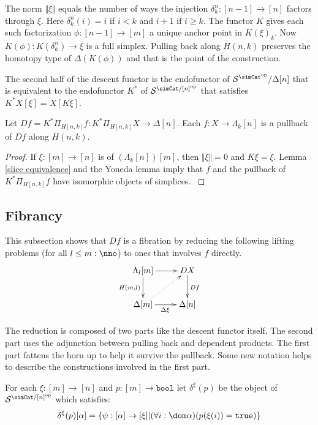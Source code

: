 \documentclass{tac}
\newcommand\cat\mathcal
\newcommand\set[1]{\left\{#1\right\}}
\newcommand\ri{^*}
\newcommand\dual{^{\mathrm{op}}}
\newcommand\s{^{\simCat\dual}}
\newcommand\of{:}
\newcommand\simplex\Delta
\newcommand\horn\Lambda
\newcommand\true{\mathtt{true}}
\newcommand\bool{\mathtt{bool}}
\newcommand\norm[1]{\Vert #1 \Vert}
\newcommand\depprod{\Pi_}
\newcommand\face\delta
\begin{document}
The norm $\norm\xi$ equals the number of ways the injection $\delta^n_k\of[n-1]\to[n]$ factors through $\xi$. Here $\delta^n_k(i)=i$ if $i<k$ and $i+1$ if $i\geq k$. The functor $K$ gives each such factorization $\phi\of[n-1]\to [m]$ a unique anchor point in $K(\xi)_k$. Now $K(\phi)\of K(\delta^n_k)\to \xi$ is a full simplex. Pulling back along $H(n,k)$ preserves the homotopy type of $\Delta(K(\phi))$ and that is the point of the construction.

The second half of the descent functor is the endofunctor of $\cat S\s/\simplex[n]$ that is equivalent to the endofunctor $K\ri$ of $\cat S^{\simCat/[n]\dual}$ that satisfies $K\ri X[\xi] = X[K\xi]$.

\begin{lemma} Let $Df = K\ri\depprod{H[n,k]}f\of K\ri\depprod{H[n,k]}X\to\simplex[n]$. Each $f\of X\to\horn_k[n]$ is a pullback of $Df$ along $H(n,k)$. \end{lemma}

\begin{proof} If $\xi\of [m]\to[n]$ is of $(\horn_k[n])[m]$, then $\norm\xi=0$ and $K\xi = \xi$. Lemma \ref{slice equivalence} and the Yoneda lemma imply that $f$ and the pullback of $K\ri\depprod{H[n,k]}f$ have isomorphic objects of simplices. \label{descent pullback}
\end{proof}

\subsection{Fibrancy}
This subsection shows that $Df$ is a fibration by reducing the following lifting problems (for all $l\leq m\of\nno$) to ones that involves $f$ directly.
\begin{equation}
	\xymatrix{
		\horn_l[m]\ar[r]\ar[d]_{H(m,l)} & DX\ar[d]^{Df} \\
		\simplex[m]\ar[r]_{\Delta\xi} \ar@{.>}[ur] & \simplex[n]
	}
	\label{descent lifting problem}
\end{equation}

The reduction is composed of two parts like the descent functor itself. The second part uses the adjunction between pulling back and dependent products. The first part fattens the horn up to help it survive the pullback. Some new notation helps to describe the constructions involved in the first part.


\begin{definition} For each $\xi\of[m]\to[n]$ and $p\of[m]\to\bool$ let $\face^\xi(p)$ be the object of $\cat S^{\simCat/[n]\dual}$ which satisfies: 
\[ \face^\xi(p)[\alpha] = \set{\psi\of [\alpha]\to[\xi] | (\forall i\of \dom\alpha)(p(\xi(i))=\true)} \]
\end{definition}
\end{document}
